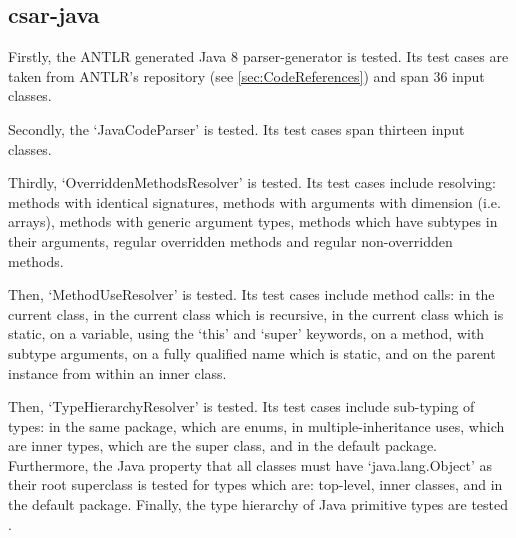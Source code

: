 \documentclass[12pt, letterpaper]{article}
\begin{document}
\subsection{csar-java}
Firstly, the ANTLR generated Java 8 parser-generator is tested.
Its test cases are taken from ANTLR's repository (see \ref{sec:CodeReferences}) and span 36 input classes.

Secondly, the `JavaCodeParser' is tested.
Its test cases span thirteen input classes.

Thirdly, `OverriddenMethodsResolver' is tested.
Its test cases include resolving: methods with identical signatures, methods with arguments with dimension (i.e. arrays), methods with generic argument types, methods which have subtypes in their arguments, regular overridden methods and regular non-overridden methods.

Then, `MethodUseResolver' is tested.
Its test cases include method calls: in the current class, in the current class which is recursive, in the current class which is static, on a variable, using the `this' and `super' keywords, on a method, with subtype arguments, on a fully qualified name which is static, and on the parent instance from within an inner class.

Then, `TypeHierarchyResolver' is tested.
Its test cases include sub-typing of types: in the same package, which are enums, in multiple-inheritance uses, which are inner types, which are the super class, and in the default package.
Furthermore, the Java property that all classes must have `java.lang.Object' as their root superclass is tested for types which are: top-level, inner classes, and in the default package.
Finally, the type hierarchy of Java primitive types are tested \autocite{javadocsnumber}.
\end{document}
